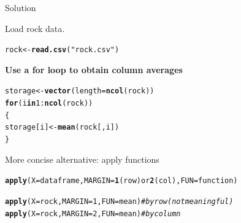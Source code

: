 \documentclass[10pt]{beamer}\usepackage[]{graphicx}\usepackage[]{color}
\makeatletter
\newcommand{\hlnum}[1]{\textcolor[rgb]{0.686,0.059,0.569}{#1}}%
\newcommand{\hlstr}[1]{\textcolor[rgb]{0.192,0.494,0.8}{#1}}%
\newcommand{\hlcom}[1]{\textcolor[rgb]{0.678,0.584,0.686}{\textit{#1}}}%
\newcommand{\hlopt}[1]{\textcolor[rgb]{0,0,0}{#1}}%
\newcommand{\hlstd}[1]{\textcolor[rgb]{0.345,0.345,0.345}{#1}}%
\newcommand{\hlkwa}[1]{\textcolor[rgb]{0.161,0.373,0.58}{\textbf{#1}}}%
\newcommand{\hlkwb}[1]{\textcolor[rgb]{0.69,0.353,0.396}{#1}}%
\newcommand{\hlkwc}[1]{\textcolor[rgb]{0.333,0.667,0.333}{#1}}%
\newcommand{\hlkwd}[1]{\textcolor[rgb]{0.737,0.353,0.396}{\textbf{#1}}}%
\newenvironment{kframe}{%
 \def\at@end@of@kframe{}%
 \ifinner\ifhmode%
  \def\at@end@of@kframe{\end{minipage}}%
  \begin{minipage}{\columnwidth}%
 \fi\fi%
 \def\FrameCommand##1{\hskip\@totalleftmargin \hskip-\fboxsep
 \colorbox{shadecolor}{##1}\hskip-\fboxsep
     \hskip-\linewidth \hskip-\@totalleftmargin \hskip\columnwidth}%
 \MakeFramed {\advance\hsize-\width
   \@totalleftmargin\z@ \linewidth\hsize
   \@setminipage}}%
 {\par\unskip\endMakeFramed%
 \at@end@of@kframe}
\newenvironment{knitrout}{}{} %
\makeatother
\begin{document}
\begin{frame}[fragile]{Solution}

Load rock data.
\begin{knitrout}
\color{fgcolor}\begin{kframe}
\begin{alltt}
\hlstd{rock} \hlkwb{<-} \hlkwd{read.csv}\hlstd{(}\hlstr{"rock.csv"}\hlstd{)}
\end{alltt}
\end{kframe}
\end{knitrout}

  \centering
\textbf{\large Use a for loop to obtain column averages}

\begin{knitrout}
\color{fgcolor}\begin{kframe}
\begin{alltt}
  \hlstd{storage} \hlkwb{<-} \hlkwd{vector}\hlstd{(}\hlkwc{length} \hlstd{=} \hlkwd{ncol}\hlstd{(rock))}
  \hlkwa{for} \hlstd{(i} \hlkwa{in} \hlnum{1}\hlopt{:}\hlkwd{ncol}\hlstd{(rock))}
  \hlstd{\{}
    \hlstd{storage[i]} \hlkwb{<-} \hlkwd{mean}\hlstd{(rock[,i])}
  \hlstd{\}}
\end{alltt}
\end{kframe}
\end{knitrout}
\end{frame}
\begin{frame}[fragile]{More concise alternative: apply functions}

\begin{knitrout}
\color{fgcolor}\begin{kframe}
\begin{alltt}
\hlkwd{apply}(X = dataframe, MARGIN = \hlkwd{1} (row) or \hlkwd{2} (col), FUN = function)
\end{alltt}
\end{kframe}
\end{knitrout}

  \pause

\begin{knitrout}
\color{fgcolor}\begin{kframe}
\begin{alltt}
\hlkwd{apply}\hlstd{(}\hlkwc{X} \hlstd{= rock,} \hlkwc{MARGIN} \hlstd{=} \hlnum{1}\hlstd{,} \hlkwc{FUN} \hlstd{= mean)}\hlcom{#by row (not meaningful)}
\hlkwd{apply}\hlstd{(}\hlkwc{X} \hlstd{= rock,} \hlkwc{MARGIN} \hlstd{=} \hlnum{2}\hlstd{,} \hlkwc{FUN} \hlstd{= mean)}\hlcom{#by column}
\end{alltt}
\end{kframe}
\end{knitrout}
\end{frame}
\end{document}
